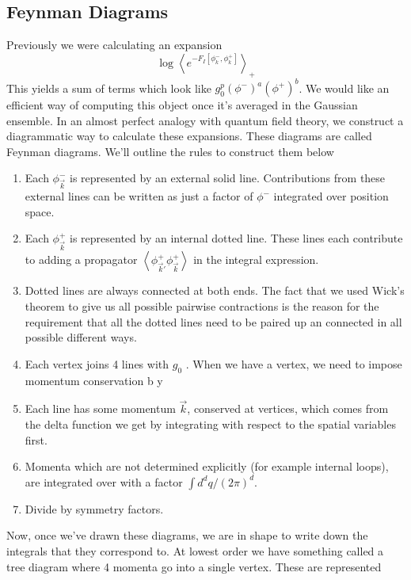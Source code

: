 \subsection{Feynman Diagrams} 

Previously we were calculating an expansion \[
	\log \left< e ^{ - F _ I [ \phi _ k ^ - , \phi _ k ^ + ] } \right>_ + 
\] This yields a sum of terms
which look like $ g _ 0 ^ p ( \phi ^ - ) ^ a ( \phi ^ + ) ^ b  $.
We would like an efficient way of computing this 
object once it's averaged in the Gaussian ensemble.
In an almost perfect analogy with quantum field theory, we 
construct a diagrammatic way to calculate
these expansions. These diagrams are called Feynman diagrams.  
We'll outline the rules to construct them below 
 \begin{enumerate}
	 \item Each $ \phi _{ \vec{k} } ^ - $ is represented by 
		 an external solid line. Contributions from 
		 these external lines can be written as 
		 just a factor of $ \phi ^ - $ integrated 
		 over position space. 
	\item Each $ \phi_{ \vec{k} } ^ + $ is represented by 
		an internal dotted line. These lines each contribute 
		to adding a propagator $ \left< \phi_{ \vec{k} '  } ^ + \phi _{ \vec{k} } ^ +  \right>$ 
		in the integral expression. 
	\item Dotted lines are always connected at both ends. The fact that we 
		used Wick's theorem to give us all possible pairwise contractions 
		is the reason for the requirement that all the dotted lines need to be 
		paired up an connected in all possible different ways. 
	\item Each vertex joins 4 lines with $ g_0 $ . When we have a vertex, we need to 
		impose momentum conservation b y
	\item Each line has some momentum $ \vec{k} $, 
		conserved at vertices, which comes from the delta function 
		we get by integrating with respect to the spatial variables first. 
	\item Momenta which are not determined explicitly (for example internal 
		loops), are integrated over with a factor $ \int  d^ d q / ( 2 \pi ) ^ d $. 
	\item Divide by symmetry factors. 
\end{enumerate}
Now, once we've drawn these diagrams, we are in shape to write 
down the integrals that they correspond to. 
At lowest order we have something called a tree diagram 
where 4 momenta go into a single vertex. These are represented 
